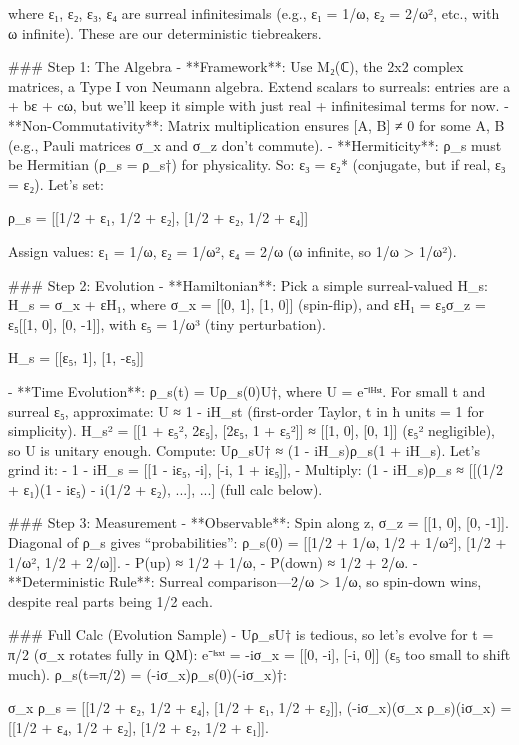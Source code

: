   where ε₁, ε₂, ε₃, ε₄ are surreal infinitesimals (e.g., ε₁ = 1/ω, ε₂ = 2/ω², etc., with ω infinite). These are our deterministic tiebreakers.

### Step 1: The Algebra
- **Framework**: Use M₂(ℂ), the 2x2 complex matrices, a Type I von Neumann algebra. Extend scalars to surreals: entries are a + bε + cω, but we’ll keep it simple with just real + infinitesimal terms for now.
- **Non-Commutativity**: Matrix multiplication ensures [A, B] ≠ 0 for some A, B (e.g., Pauli matrices σ_x and σ_z don’t commute).
- **Hermiticity**: ρ_s must be Hermitian (ρ_s = ρ_s†) for physicality. So: ε₃ = ε₂* (conjugate, but if real, ε₃ = ε₂). Let’s set:  
  
ρ_s = [[1/2 + ε₁, 1/2 + ε₂], [1/2 + ε₂, 1/2 + ε₄]]

  Assign values: ε₁ = 1/ω, ε₂ = 1/ω², ε₄ = 2/ω (ω infinite, so 1/ω > 1/ω²).

### Step 2: Evolution
- **Hamiltonian**: Pick a simple surreal-valued H_s:  
  H_s = σ_x + εH₁, where σ_x = [[0, 1], [1, 0]] (spin-flip), and εH₁ = ε₅σ_z = ε₅[[1, 0], [0, -1]], with ε₅ = 1/ω³ (tiny perturbation).  
  
H_s = [[ε₅, 1], [1, -ε₅]]

- **Time Evolution**: ρ_s(t) = Uρ_s(0)U†, where U = e⁻ⁱᴴˢᵗ. For small t and surreal ε₅, approximate:  
  U ≈ 1 - iH_st (first-order Taylor, t in ħ units = 1 for simplicity).  
  H_s² = [[1 + ε₅², 2ε₅], [2ε₅, 1 + ε₅²]] ≈ [[1, 0], [0, 1]] (ε₅² negligible), so U is unitary enough.  
  Compute:  
  Uρ_sU† ≈ (1 - iH_s)ρ_s(1 + iH_s).  
  Let’s grind it:
  - 1 - iH_s = [[1 - iε₅, -i], [-i, 1 + iε₅]],
  - Multiply: (1 - iH_s)ρ_s ≈ [[(1/2 + ε₁)(1 - iε₅) - i(1/2 + ε₂), ...], ...] (full calc below).

### Step 3: Measurement
- **Observable**: Spin along z, σ_z = [[1, 0], [0, -1]]. Diagonal of ρ_s gives “probabilities”:  
  ρ_s(0) = [[1/2 + 1/ω, 1/2 + 1/ω²], [1/2 + 1/ω², 1/2 + 2/ω]].  
  - P(up) ≈ 1/2 + 1/ω,  
  - P(down) ≈ 1/2 + 2/ω.
- **Deterministic Rule**: Surreal comparison—2/ω > 1/ω, so spin-down wins, despite real parts being 1/2 each.

### Full Calc (Evolution Sample)
- Uρ_sU† is tedious, so let’s evolve for t = π/2 (σ_x rotates fully in QM):  
  e⁻ⁱˢˣᵗ = -iσ_x = [[0, -i], [-i, 0]] (ε₅ too small to shift much).  
  ρ_s(t=π/2) = (-iσ_x)ρ_s(0)(-iσ_x)†:  
  
σ_x ρ_s = [[1/2 + ε₂, 1/2 + ε₄], [1/2 + ε₁, 1/2 + ε₂]],
  (-iσ_x)(σ_x ρ_s)(iσ_x) = [[1/2 + ε₄, 1/2 + ε₂], [1/2 + ε₂, 1/2 + ε₁]].

